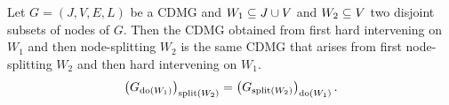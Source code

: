 \documentclass[main]{subfiles}
\begin{document}
\def\rowref{claim\_3\_8}
\label{claim_3_8}
%

\begin{Lem}
   Let $G=(J,V,E,L)$ be a CDMG and $W_1 \subseteq J \cup V$ and $W_2 \subseteq V$ two disjoint subsets of nodes of $G$.
   Then the CDMG obtained from first hard intervening on $W_1$ and then node-splitting $W_2$ is the same CDMG that arises from first node-splitting $W_2$ and then hard intervening on $W_1$.
      \[ \left ( G_{\operatorname{do}(W_1)} \right )_{\mathrm{split}(W_2)} =  \left ( G_{\mathrm{split}(W_2)} \right )_{\operatorname{do}(W_1)}.   \]
\end{Lem}
\end{document}
